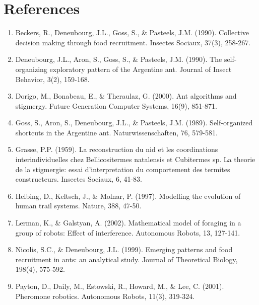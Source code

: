 \documentclass{article}
\begin{document}
\section{References}
\begin{enumerate}
    \item Beckers, R., Deneubourg, J.L., Goss, S., \& Pasteels, J.M. (1990). Collective decision making through food recruitment. Insectes Sociaux, 37(3), 258-267.
    \item Deneubourg, J.L., Aron, S., Goss, S., \& Pasteels, J.M. (1990). The self-organizing exploratory pattern of the Argentine ant. Journal of Insect Behavior, 3(2), 159-168.
    \item Dorigo, M., Bonabeau, E., \& Theraulaz, G. (2000). Ant algorithms and stigmergy. Future Generation Computer Systems, 16(9), 851-871.
    \item Goss, S., Aron, S., Deneubourg, J.L., \& Pasteels, J.M. (1989). Self-organized shortcuts in the Argentine ant. Naturwissenschaften, 76, 579-581.
    \item Grasse, P.P. (1959). La reconstruction du nid et les coordinations interindividuelles chez Bellicositermes natalensis et Cubitermes sp. La theorie de la stigmergie: essai d'interpretation du comportement des termites constructeurs. Insectes Sociaux, 6, 41-83.  
    \item Helbing, D., Keltsch, J., \& Molnar, P. (1997). Modelling the evolution of human trail systems. Nature, 388, 47-50.
    \item Lerman, K., \& Galstyan, A. (2002). Mathematical model of foraging in a group of robots: Effect of interference. Autonomous Robots, 13, 127-141.   
    \item Nicolis, S.C., \& Deneubourg, J.L. (1999). Emerging patterns and food recruitment in ants: an analytical study. Journal of Theoretical Biology, 198(4), 575-592. 
    \item Payton, D., Daily, M., Estowski, R., Howard, M., \& Lee, C. (2001). Pheromone robotics. Autonomous Robots, 11(3), 319-324.
    
\end{enumerate}
\end{document}

